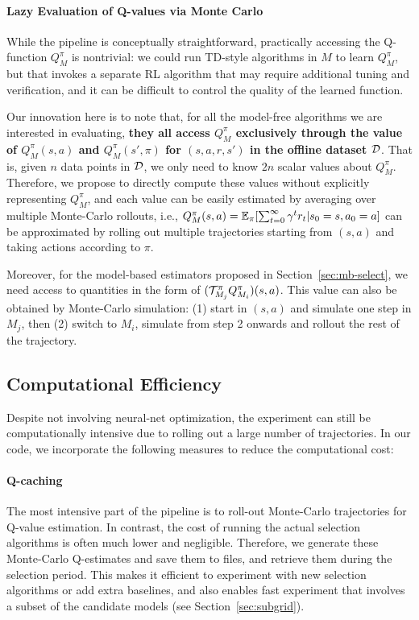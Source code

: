 \paragraph{Lazy Evaluation of Q-values via Monte Carlo} While the pipeline is conceptually straightforward, practically accessing the Q-function $Q_M^\pi$ is nontrivial: we could run TD-style algorithms in  $M$ to learn $Q_M^\pi$, but that invokes a separate RL algorithm that may require additional tuning and verification, and it can be difficult to control the quality of the learned function. 

Our innovation here is to note that, for all the model-free algorithms we are interested in evaluating, \textbf{they all access $Q_M^\pi$ exclusively through the value of $Q_M^\pi(s,a)$ and $Q_M^\pi(s',\pi)$ for $(s,a,r,s')$ in the offline dataset $\mathcal{D}$}. That is, given $n$ data points in $\mathcal{D}$, we only need to know $2n$ scalar values about $Q_M^\pi$. Therefore, we propose to directly compute these values without explicitly representing $Q_M^\pi$, and each value can be easily estimated by averaging over multiple Monte-Carlo rollouts, i.e., $Q_M^\pi(s,a) = \mathbb{E}_{\pi}[\sum_{t=0}^\infty \gamma^{t} r_t | s_0 = s, a_0 = a]$ can be approximated by rolling out multiple trajectories starting from $(s,a)$ and taking actions according to $\pi$.

Moreover, for the model-based estimators proposed in Section~\ref{sec:mb-select}, we need access to quantities in the form of $(\mathcal{T}_{M_j}^\pi Q_{M_i}^\pi)(s,a)$. This value can also be obtained by Monte-Carlo simulation: (1) start in $(s,a)$ and simulate one step in $M_j$, then (2) switch to $M_i$, simulate from step 2 onwards and rollout the rest of the trajectory. 

%

\subsection{Computational Efficiency}
Despite not involving neural-net optimization, the experiment can still be computationally intensive due to rolling out a large number of trajectories. In our code, we incorporate the following measures to reduce the computational cost:

\paragraph{Q-caching} The most intensive part of the pipeline is to roll-out Monte-Carlo trajectories for Q-value estimation. In contrast, the cost of running the actual selection algorithms is often much lower and negligible. Therefore, we generate these Monte-Carlo Q-estimates and save them to files, and retrieve them during the selection period. This makes it efficient to experiment with new selection algorithms or add extra baselines, and also enables fast experiment that involves a subset of the candidate models (see Section~\ref{sec:subgrid}). 

